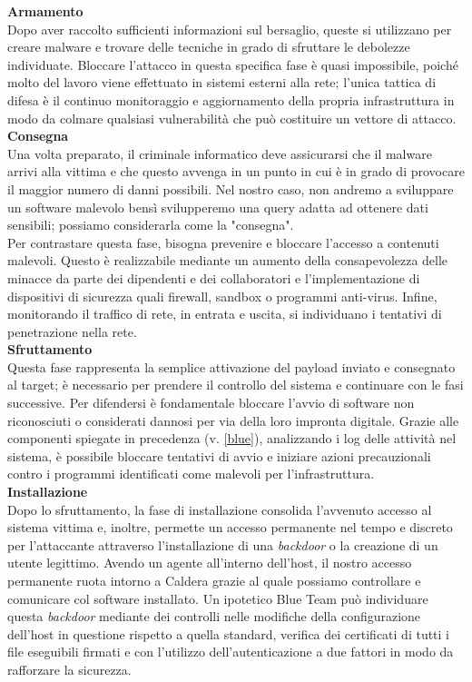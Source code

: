 \noindent
{\bfseries\Large{\textbf{Armamento}}}\\[1em]
Dopo aver raccolto sufficienti informazioni sul bersaglio, queste si utilizzano per creare malware e trovare delle tecniche in grado di sfruttare le debolezze individuate. Bloccare l'attacco in questa specifica fase è quasi impossibile, poiché molto del lavoro viene effettuato in sistemi esterni alla rete; l'unica tattica di difesa è il continuo monitoraggio e aggiornamento della propria infrastruttura in modo da colmare qualsiasi vulnerabilità che può costituire un vettore di attacco.\\

\noindent
{\bfseries\Large{\textbf{Consegna}}}\\[1em]
Una volta preparato, il criminale informatico deve assicurarsi che il malware arrivi alla vittima e che questo avvenga in un punto in cui è in grado di provocare il maggior numero di danni possibili. Nel nostro caso, non andremo a sviluppare un software malevolo bensì svilupperemo una query adatta ad ottenere dati sensibili; possiamo considerarla come la "consegna".\\ 
Per contrastare questa fase, bisogna prevenire e bloccare l'accesso a contenuti malevoli. Questo è realizzabile mediante un aumento della consapevolezza delle minacce da parte dei dipendenti e dei collaboratori e l'implementazione di dispositivi di sicurezza quali firewall, sandbox o programmi anti-virus. Infine, monitorando il traffico di rete, in entrata e uscita, si individuano i tentativi di penetrazione nella rete.\\ 

\noindent
{\bfseries\Large{\textbf{Sfruttamento}}}\\[1em]
Questa fase rappresenta la semplice attivazione del payload inviato e consegnato al target; è necessario per prendere il controllo del sistema e continuare con le fasi successive. Per difendersi è fondamentale bloccare l'avvio di software non riconosciuti o considerati dannosi per via della loro impronta digitale. Grazie alle componenti spiegate in precedenza (v. \ref{blue}), analizzando i log delle attività nel sistema, è possibile bloccare tentativi di avvio e iniziare azioni precauzionali contro i programmi identificati come malevoli per l'infrastruttura.\\

\noindent
{\bfseries\Large{\textbf{Installazione}}}\\[1em]
Dopo lo sfruttamento, la fase di installazione consolida l'avvenuto accesso al sistema vittima e, inoltre, permette un accesso permanente nel tempo e discreto per l'attaccante attraverso l'installazione di una \textit{backdoor} o la creazione di un utente legittimo. Avendo un agente all'interno dell'host, il nostro accesso permanente ruota intorno a Caldera grazie al quale possiamo controllare e comunicare col software installato. Un ipotetico Blue Team può individuare questa \textit{backdoor} mediante dei controlli nelle modifiche della configurazione dell'host in questione rispetto a quella standard, verifica dei certificati di tutti i file eseguibili firmati e con l'utilizzo dell'autenticazione a due fattori in modo da rafforzare la sicurezza.\\


